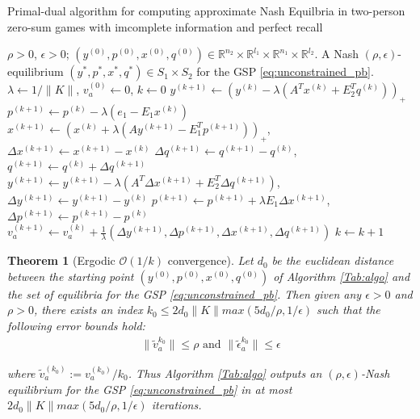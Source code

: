 \documentclass{article} %
\newtheorem{theorem}{Theorem} \newtheorem{lemma}[theorem]{Lemma}
\begin{document}
\begin{algorithm}
\caption{Primal-dual algorithm for computing approximate Nash
  Equilbria in two-person zero-sum games with imcomplete information
  and perfect recall}
\label{Tab:algo}
\begin{algorithmic}[1]
\Require $\rho >0$, $\epsilon > 0$; $(y^{(0)},p^{(0)},x^{(0)},q^{(0)})
\in \mathbb{R}^{n_2}
  \times \mathbb{R}^{l_1} \times \mathbb{R}^{n_1} \times
  \mathbb{R}^{l_2}$.
\Ensure A Nash $(\rho, \epsilon)$-equilibrium
$({y^*},{p^*},{x^*},{q^*}) \in S_1 \times S_2$ for
the GSP \eqref{eq:unconstrained_pb}.
\State  $\lambda \leftarrow 1/\|K\|$, ${v}_a^{(0)} \leftarrow 0$, $k
\leftarrow 0$
\State $y^{(k + 1)} \leftarrow (y^{(k)} - \lambda (A^Tx^{(k)} +
E_2^Tq^{(k)}))_+$
\State  $p^{(k+1)} \leftarrow p^{(k)} -
\lambda(e_1-E_1x^{(k)})$
\State $x^{(k + 1)} \leftarrow (x^{(k)} + \lambda (Ay^{(k+1)} -
E_1^Tp^{(k+1)}))_+$, \hspace{.5em}$\Delta x^{(k+1)} \leftarrow
x^{(k+1)}-x^{(k)}$
\State $\Delta q^{(k+1)} \leftarrow
q^{(k+1)}-q^{(k)}$, \hspace{.5em}$q^{(k+1)}
\leftarrow q^{(k)} + \Delta q^{(k+1)}$
\State $y^{(k+1)} \leftarrow y^{(k+1)} - \lambda (A^T\Delta x^{(k+1)}
+ E_2^T\Delta q^{(k+1)})$, \hspace{.5em}$\Delta y^{(k+1)} \leftarrow
y^{(k+1)}-y^{(k)}$
\State $p^{(k+1)} \leftarrow p^{(k+1)} + \lambda E_1\Delta x^{(k+1)}$,
\hspace{.5em} $\Delta p^{(k+1)} \leftarrow p^{(k+1)}-p^{(k)}$
\State ${v}_a^{(k+1)} \leftarrow {v}_a^{(k)} +
\frac{1}{\lambda}(\Delta
y^{(k+1)},\Delta p^{(k+1)},\Delta x^{(k+1)},\Delta q^{(k+1)})$
\State $k \leftarrow k + 1$
\EndWhile
\end{algorithmic}
\end{algorithm}

\begin{theorem}[Ergodic $\mathcal{O}(1/k)$ convergence]
Let $d_0$ be the euclidean distance between the starting point
$(y^{(0)},p^{(0)},x^{(0)},q^{(0)})$ of Algorithm \ref{Tab:algo} and the
set of equilibria for the GSP \eqref{eq:unconstrained_pb}.
Then given any $\epsilon > 0$ and $\rho > 0$, there exists an index
$k_0 \le 2d_0\|K\|max(5d_0/\rho, 1/\epsilon)$ such that the following
error bounds hold:
\begin{eqnarray}
\|\tilde{v}_a^{k_0}\| \le \rho \text{ and }
\|\tilde{\epsilon}_a^{k_0}\| \le \epsilon
\end{eqnarray}

where $\tilde{v}_a^{(k_0)} := v_a^{(k_0)}/k_0$.
Thus Algorithm \ref{Tab:algo} outputs an $(\rho,\epsilon)$-Nash
equilibrium for the GSP \eqref{eq:unconstrained_pb}
in at most $2d_0\|K\|max(5d_0/\rho, 1/\epsilon)$ iterations.
\end{theorem}
\end{document}
